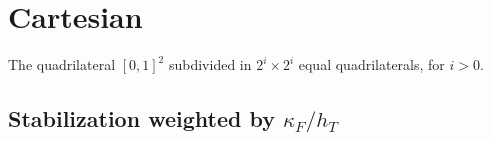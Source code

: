 \documentclass[10pt]{article}
\begin{document}
\FloatBarrier

\section{Cartesian}
    The quadrilateral $[0,1]^2$ subdivided in $2^i \times 2^i$ equal quadrilaterals, for $i > 0$.

\subsection{Stabilization weighted by $\kappa_F/h_T$}
  \begin{figure}[ht]
    \centering
      \scalebox{0.4}{}%
      \scalebox{0.4}{}%
      \scalebox{0.4}{}
      \scalebox{0.4}{}%
      \scalebox{0.4}{}%
      \scalebox{0.4}{}
  \end{figure}

  \begin{figure}[ht]
    \centering
      \scalebox{0.4}{}%
      \scalebox{0.4}{}%
      \scalebox{0.4}{}
      \scalebox{0.4}{}%
      \scalebox{0.4}{}%
      \scalebox{0.4}{}
      \scalebox{0.4}{}%
      \scalebox{0.4}{}%
      \scalebox{0.4}{}
  \end{figure}

  \begin{figure}[ht]
    \centering
      \scalebox{0.4}{}%
      \scalebox{0.4}{}%
      \scalebox{0.4}{}
      \scalebox{0.4}{}%
      \scalebox{0.4}{}%
      \scalebox{0.4}{}
      \scalebox{0.4}{}%
      \scalebox{0.4}{}%
      \scalebox{0.4}{}
  \end{figure}
\FloatBarrier
\end{document}
